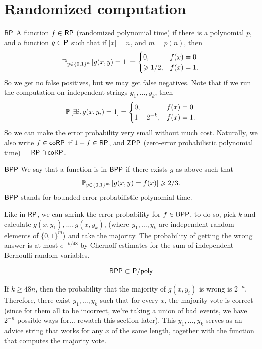 \documentclass{article}
\begin{document}
\section{Randomized computation}
\begin{fancydefine}{$\mathsf{RP}$}
    A function $f \in \mathsf{RP}$ (randomized polynomial time) if there is a polynomial $p$, and a function $g \in \mathsf{P}$ such that if $|x|=n$, and $m=p(n)$, then \[ 
        \mathbb{P}_{y \in \{0,1\}^{n}} \left[ g(x,y) = 1 \right] = \begin{cases}
            0, & f(x)=0\\
            \geqslant 1/2, & f(x)=1.
        \end{cases}\]
        So we get no false positives, but we may get false negatives. Note that if we run the computation on independent strings $y_{1},\dots, y_{k}$, then \[ \mathbb{P} \left[ \exists i. \, g(x,y_{i})=1\right] = \begin{cases}
            0, & f(x)=0\\
            1-2^{-k}, & f(x)=1.
        \end{cases}\]
        So we can make the error probability very small without much cost.\gap 
        Naturally, we also write $f \in \mathsf{coRP}$ if $1-f \in \mathsf{RP}$, and $\mathsf{ZPP}$ (zero-error probabilistic polynomial time) = $\mathsf{RP} \cap \mathsf{coRP}$. 
\end{fancydefine}
\begin{fancydefine}{$\mathsf{BPP}$}
    We say that a function is in $\mathsf{BPP}$ if there exists $g$ as above such that \[ \mathbb{P}_{y \in \{0,1\}^{m}} \left[ g(x,y)=f(x)\right] \geqslant 2/3.\]
    $\mathsf{BPP}$ stands for bounded-error probabilistic polynomial time. 
\end{fancydefine}
Like in $\mathsf{RP}$, we can shrink the error probability for $f \in \mathsf{BPP}$, to do so, pick $k$ and calculate $g(x,y_{1}), \dots, g(x,y_{k})$, (where $y_{1},\dots, y_{k}$ are independent random elements of $\{0,1\}^{m}$) and take the majority. The probability of getting the wrong answer is at most $e^{-k/48}$ by Chernoff estimates for the sum of independent Bernoulli random variables.
\begin{corr}{}
    \[ \mathsf{BPP} \subset \mathsf{P/poly}\] 
\end{corr}
\proof If $k \geq 48n$, then the probability that the majority of $g(x,y_{i})$ is wrong is $2^{-n}$. Therefore, there exist $y_{1}, \dots, y_{k}$ such that for every $x$, the majority vote is correct (since for them all to be incorrect, we're taking a union of bad events, we have $2^{-n}$ possible ways for... rewatch this section later). This $y_{1},\dots, y_{k}$ serves as an advice string that works for any $x$ of the same length, together with the function that computes the majority vote. \endproof 
\end{document}

